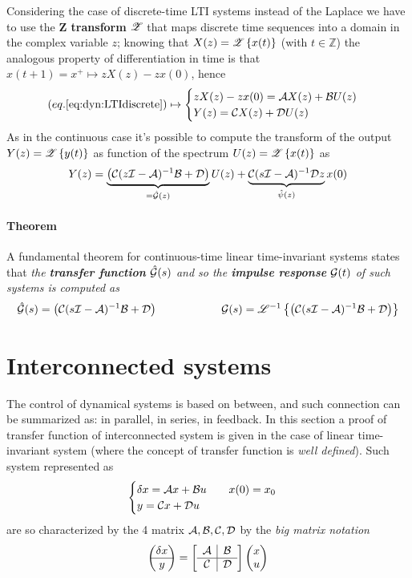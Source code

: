 	Considering the case of discrete-time LTI  systems instead of the Laplace we have to use the \textbf{Z transform} $\mathscr{Z}$ that maps discrete time sequences into a domain in the complex variable $z$; knowing that $X(z) = \mathscr{Z}\left\{x(t)\right\}$ (with $t\in \mathds Z$) the analogous property of differentiation in time is that $x(t+1) = x^+ \mapsto z X(z) - z x(0)$, hence
	\begin{equation}
		(eq.\ref{eq:dyn:LTIdiscrete} )\mapsto \begin{cases}
			z X(z) - z x(0) = \mathcal{A} X(z) + \mathcal{B} U(z) \\ Y(z) = \mathcal{C} X(z) + \mathcal{D} U(z)
		\end{cases}
	\end{equation}
	As in the continuous case it's possible to compute the transform of the output $Y(z) = \mathscr{Z}\left\{y(t)\right\}$ as function of the spectrum $U(z) = \mathscr{Z}\left\{x(t)\right\}$ as
	\begin{equation}
		Y(z) = \underbrace{\left(\mathcal{C} (z\mathcal{I} - \mathcal{A})^{-1} \mathcal{B} + \mathcal{D}\right)}_{= \hat {\mathcal{G}}(z)} U(z) + \underbrace{\mathcal{C}(s\mathcal{I}-\mathcal{A})^{-1} \mathcal{D} z}_{\hat \psi(z)} x(0)
	\end{equation}

	\paragraph{Theorem} A fundamental theorem for continuous-time linear time-invariant systems states that \textit{the \textbf{transfer function} $\hat {\mathcal{G}}(s)$ and so the \textbf{impulse response} $\mathcal{G}(t)$ of such systems is computed as}
	\begin{equation}
		\hat {\mathcal{G}}(s) = \left(\mathcal{C} (s\mathcal{I} - \mathcal{A})^{-1} \mathcal{B} + \mathcal{D}\right) \hspace{2cm} \mathcal{G}(s) = \mathscr{L}^{-1} \left\{ \left(\mathcal{C} (s\mathcal{I} - \mathcal{A})^{-1} \mathcal{B} + \mathcal{D}\right) \right\}
	\end{equation}
	
\section{Interconnected systems}
	The control of dynamical systems is based on  between, and such connection can be summarized as: in parallel, in series, in feedback. In this section a proof of transfer function of interconnected system is given in the case of linear time-invariant system (where the concept of transfer function is \textit{well defined}). Such system represented as 
	\[ \begin{cases}
		\delta x = \mathcal{A} x + \mathcal{B} u \qquad x(0) = x_0\\ y = \mathcal{C} x + \mathcal{D} u 
	\end{cases} \]
	are so characterized by the 4 matrix $\mathcal{A},\mathcal{B},\mathcal{C},\mathcal{D}$ by the \textit{big matrix notation}
	\[ \begin{pmatrix} \delta x \\ \hline y \end{pmatrix} = \begin{bmatrix}
		\begin{array}{c | c}
			\mathcal{A} & \mathcal{B} \\ \hline \mathcal{C} & \mathcal{D}
		\end{array} 
	\end{bmatrix} \begin{pmatrix} x \\ u  \end{pmatrix}\]
	
